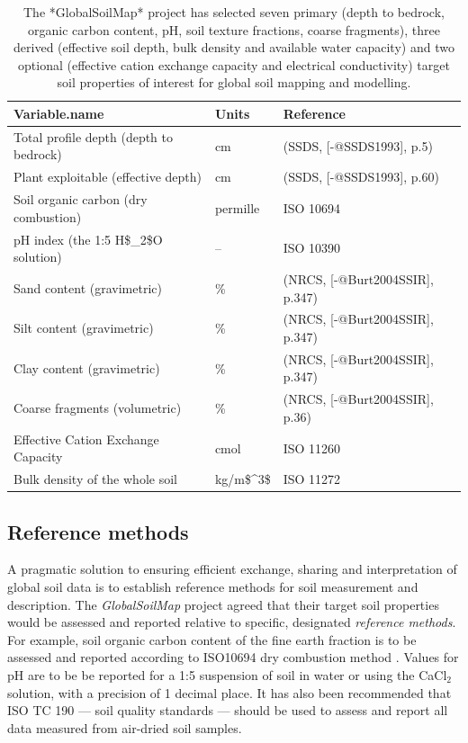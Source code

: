 \documentclass[11pt]{krantz}
\theoremstyle{definition}
\theoremstyle{definition}
\theoremstyle{definition}
\theoremstyle{remark}
\begin{document}
\begin{table}

\caption{\label{tab:globalsoilmap}The *GlobalSoilMap* project has selected seven primary (depth to bedrock, organic carbon content, pH, soil texture fractions, coarse fragments), three derived (effective soil depth, bulk density and available water capacity) and two optional (effective cation exchange capacity and electrical conductivity) target soil properties of interest for global soil mapping and modelling.}
\centering
\begin{tabular}[t]{lll}
\toprule
Variable.name & Units & Reference\\
\midrule
Total profile depth (depth to bedrock) & cm & (SSDS, [-@SSDS1993], p.5)\\
Plant exploitable (effective depth) & cm & (SSDS, [-@SSDS1993], p.60)\\
Soil organic carbon (dry combustion) & permille & ISO 10694\\
pH index (the 1:5 H\$\_2\$O solution) & – & ISO 10390\\
Sand content (gravimetric) & \% & (NRCS, [-@Burt2004SSIR], p.347)\\
\addlinespace
Silt content (gravimetric) & \% & (NRCS, [-@Burt2004SSIR], p.347)\\
Clay content (gravimetric) & \% & (NRCS, [-@Burt2004SSIR], p.347)\\
Coarse fragments (volumetric) & \% & (NRCS, [-@Burt2004SSIR], p.36)\\
Effective Cation Exchange Capacity & cmol & ISO 11260\\
Bulk density of the whole soil & kg/m\$\textasciicircum{}3\$ & ISO 11272\\
\bottomrule
\end{tabular}
\end{table}

\hypertarget{reference-methods}{%
\subsection{Reference methods}\label{reference-methods}}

A pragmatic solution to ensuring efficient exchange, sharing and
interpretation of global soil data is to establish reference methods for
soil measurement and description. The \emph{GlobalSoilMap} project
agreed that their target soil properties would be assessed and reported
relative to specific, designated \emph{reference methods}. For example,
soil organic carbon content of the fine earth fraction is to be assessed
and reported according to ISO10694 dry combustion method
\citep{Sleutel2007CSSPA}. Values for pH are to be be reported for a 1:5
suspension of soil in water or using the CaCl\(_2\) solution, with a
precision of 1 decimal place. It has also been recommended that ISO TC
190 --- soil quality standards --- should be used to assess and report
all data measured from air-dried soil samples.
\end{document}
